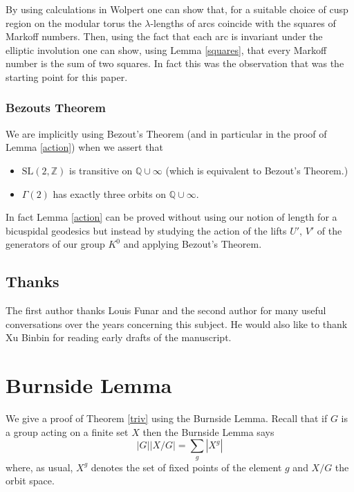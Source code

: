 \documentclass[12pt,a4paper]{amsart}
\def\ZZ{\mathbb{Z}}
\def\QQ{\mathbb{Q}}
\def\sl2{\mathrm{SL}(2, \ZZ)}
\def\g2{\Gamma(2)}
\begin{document}
 By using calculations in Wolpert \cite{saw}
 one can show that, for a suitable choice of cusp region 
 on the modular torus  the $\lambda$-lengths of arcs 
 coincide with the squares of Markoff numbers. 
 Then, using the fact that each arc is invariant under the 
 elliptic involution one can show, 
using Lemma \ref{squares},
 that every Markoff number is the sum of two squares.
 In fact this was the observation that was the starting point for this paper.
 
 \subsubsection{Bezouts Theorem}
 We are implicitly using  Bezout's Theorem
 (and in particular in the proof of Lemma \ref{action})
 when we assert that
 \begin{itemize}
 \item $\sl2$ is transitive on $\QQ \cup \infty$ (which is equivalent to Bezout's Theorem.)
 \item $\g2$ has exactly three orbits on $\QQ \cup \infty$.
 \end{itemize}
In fact Lemma \ref{action} can be proved
 without using our notion of length for a bicuspidal geodesics 
 but  instead by studying the action of 
 the lifts $U'$, $V'$  of the generators of our group $K^0$  
 and applying Bezout's Theorem.
 

\subsection{Thanks}

The first author thanks Louis Funar and the second author for  many useful
conversations over the years concerning this subject. He would also like to
thank Xu Binbin for reading early drafts of the manuscript.


\section{Burnside Lemma}

We give a proof of Theorem \ref{triv} using the Burnside Lemma.
Recall that if $G$ is  a group acting on a finite set $X$ then the Burnside Lemma says
\begin{equation}\label{burnside}
|G| |X/G| = \sum_{g} |X^g| 
\end{equation}  
where, as usual, 
 $X^g$ denotes the set of fixed points of the element $g$ 
 and $X/G$  the orbit space.
\end{document}
